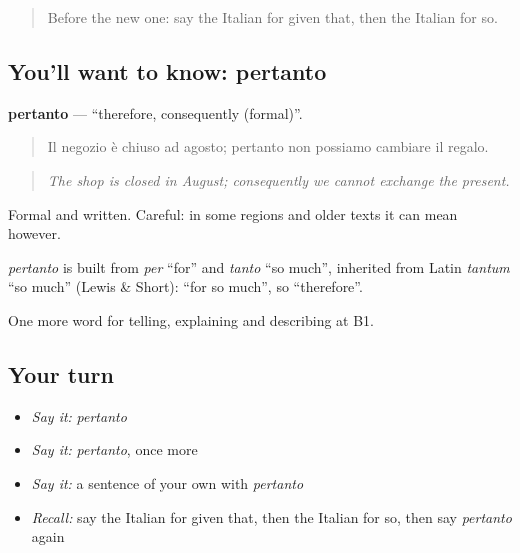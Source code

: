 \begin{quote}
Before the new one: say the Italian for given that, then the Italian for so.
\end{quote}

\subsection*{You'll want to know: pertanto}
\textbf{pertanto} — \textquotedblleft{}therefore, consequently (formal)\textquotedblright{}.

\begin{quote}
Il negozio è chiuso ad agosto; pertanto non possiamo cambiare il regalo.
\end{quote}

\begin{quote}
\emph{The shop is closed in August; consequently we cannot exchange the present.}
\end{quote}

Formal and written. Careful: in some regions and older texts it can mean however.

\begin{cousinweb}
\emph{pertanto} is built from \emph{per} \textquotedblleft{}for\textquotedblright{} and \emph{tanto} \textquotedblleft{}so much\textquotedblright{}, inherited from Latin \emph{tantum} \textquotedblleft{}so much\textquotedblright{} (Lewis \& Short): \textquotedblleft{}for so much\textquotedblright{}, so \textquotedblleft{}therefore\textquotedblright{}.
\end{cousinweb}

\begin{grammarlens}[title={What you've built}]
One more word for telling, explaining and describing at B1.
\end{grammarlens}

\subsection*{Your turn}
\begin{itemize}
\raggedright
  \item \emph{Say it:} \emph{pertanto}
  \item \emph{Say it:} \emph{pertanto}, once more
  \item \emph{Say it:} a sentence of your own with \emph{pertanto}
  \item \emph{Recall:} say the Italian for given that, then the Italian for so, then say \emph{pertanto} again
\end{itemize}


